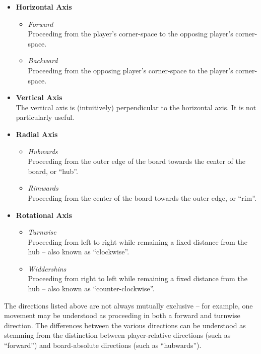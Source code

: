   \begin{itemize}
  \item {\bf Horizontal Axis}
    \begin{itemize}
    \item {\sl Forward}\\
      Proceeding from the player's corner-space to the
      opposing player's corner-space.
    \item {\sl Backward}\\
      Proceeding from the opposing player's
      corner-space to the player's corner-space.
    \end{itemize}
    
  \item {\bf Vertical Axis}\\
    The vertical axis is (intuitively) perpendicular to the horizontal
    axis.  It is not particularly useful.

  \item {\bf Radial Axis}
    \begin{itemize}
      \item {\sl Hubwards}\\
        Proceeding from the outer edge of the board towards
        the center of the board, or ``hub''.
      \item {\sl Rimwards}\\
        Proceeding from the center of the board towards the
        outer edge, or ``rim''.
    \end{itemize}

  \item {\bf Rotational Axis}
    \begin{itemize}
      \item {\sl Turnwise}\\
        Proceeding from left to right while remaining a fixed distance
        from the hub -- also known as ``clockwise''.
      \item {\sl Widdershins}\\
        Proceeding from right to left while remaining a fixed distance
        from the hub -- also known as ``counter-clockwise''.
    \end{itemize}
  \end{itemize}

The directions listed above are not always mutually exclusive --
for example, one movement may be understood as proceeding in both a
forward and turnwise direction.  The differences between the various
directions can be understood as stemming from the distinction between
player-relative directions (such as ``forward'') and board-absolute
directions (such as ``hubwards'').

